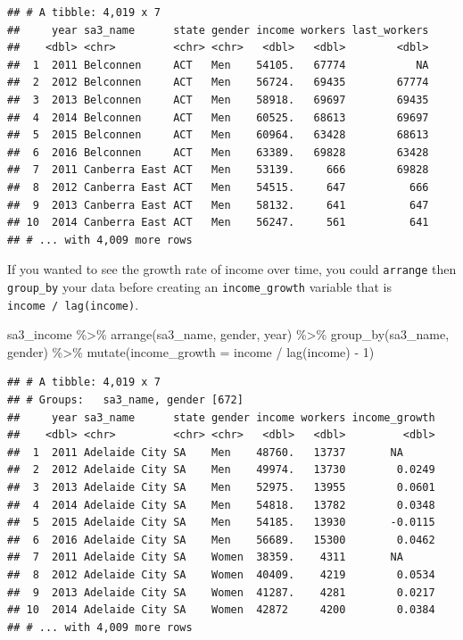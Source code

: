 \documentclass[
]{book}
\newenvironment{Shaded}{\begin{snugshade}}{\end{snugshade}}
\newcommand{\AttributeTok}[1]{\textcolor[rgb]{0.77,0.63,0.00}{#1}}
\newcommand{\DecValTok}[1]{\textcolor[rgb]{0.00,0.00,0.81}{#1}}
\newcommand{\FunctionTok}[1]{\textcolor[rgb]{0.00,0.00,0.00}{#1}}
\newcommand{\NormalTok}[1]{#1}
\newcommand{\SpecialCharTok}[1]{\textcolor[rgb]{0.00,0.00,0.00}{#1}}
\begin{document}
\begin{verbatim}
## # A tibble: 4,019 x 7
##     year sa3_name      state gender income workers last_workers
##    <dbl> <chr>         <chr> <chr>   <dbl>   <dbl>        <dbl>
##  1  2011 Belconnen     ACT   Men    54105.   67774           NA
##  2  2012 Belconnen     ACT   Men    56724.   69435        67774
##  3  2013 Belconnen     ACT   Men    58918.   69697        69435
##  4  2014 Belconnen     ACT   Men    60525.   68613        69697
##  5  2015 Belconnen     ACT   Men    60964.   63428        68613
##  6  2016 Belconnen     ACT   Men    63389.   69828        63428
##  7  2011 Canberra East ACT   Men    53139.     666        69828
##  8  2012 Canberra East ACT   Men    54515.     647          666
##  9  2013 Canberra East ACT   Men    58132.     641          647
## 10  2014 Canberra East ACT   Men    56247.     561          641
## # ... with 4,009 more rows
\end{verbatim}

If you wanted to see the growth rate of income over time, you could \texttt{arrange} then \texttt{group\_by} your data before creating an \texttt{income\_growth} variable that is \texttt{income\ /\ lag(income)}.

\begin{Shaded}
\begin{Highlighting}[]
\NormalTok{sa3\_income }\SpecialCharTok{\%\textgreater{}\%}
  \FunctionTok{arrange}\NormalTok{(sa3\_name, gender, year) }\SpecialCharTok{\%\textgreater{}\%} 
  \FunctionTok{group\_by}\NormalTok{(sa3\_name, gender) }\SpecialCharTok{\%\textgreater{}\%} 
  \FunctionTok{mutate}\NormalTok{(}\AttributeTok{income\_growth =}\NormalTok{ income }\SpecialCharTok{/} \FunctionTok{lag}\NormalTok{(income) }\SpecialCharTok{{-}} \DecValTok{1}\NormalTok{)}
\end{Highlighting}
\end{Shaded}

\begin{verbatim}
## # A tibble: 4,019 x 7
## # Groups:   sa3_name, gender [672]
##     year sa3_name      state gender income workers income_growth
##    <dbl> <chr>         <chr> <chr>   <dbl>   <dbl>         <dbl>
##  1  2011 Adelaide City SA    Men    48760.   13737       NA     
##  2  2012 Adelaide City SA    Men    49974.   13730        0.0249
##  3  2013 Adelaide City SA    Men    52975.   13955        0.0601
##  4  2014 Adelaide City SA    Men    54818.   13782        0.0348
##  5  2015 Adelaide City SA    Men    54185.   13930       -0.0115
##  6  2016 Adelaide City SA    Men    56689.   15300        0.0462
##  7  2011 Adelaide City SA    Women  38359.    4311       NA     
##  8  2012 Adelaide City SA    Women  40409.    4219        0.0534
##  9  2013 Adelaide City SA    Women  41287.    4281        0.0217
## 10  2014 Adelaide City SA    Women  42872     4200        0.0384
## # ... with 4,009 more rows
\end{verbatim}
\end{document}
